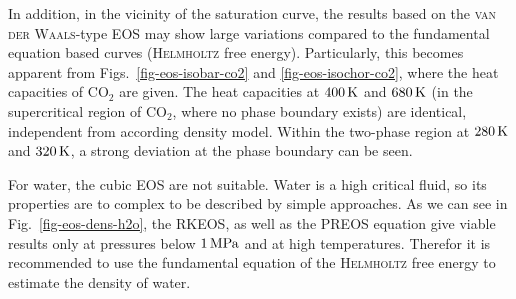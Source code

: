 In addition, in the vicinity of the saturation curve, the results based on the \textsc{van der Waals}-type EOS may show large variations compared to the fundamental equation based curves (\textsc{Helmholtz} free energy). Particularly, this becomes apparent from Figs.~\ref{fig-eos-isobar-co2} and \ref{fig-eos-isochor-co2}, where the heat capacities of $\mathrm{CO_2}$ are given. The heat capacities at $\unit[400]{K}$ and $\unit[680]{K}$ (in the supercritical region of $\mathrm{CO_2}$, where no phase boundary exists) are identical, independent from according density model. Within the two-phase region at $\unit[280]{K}$ and $\unit[320]{K}$, a strong deviation at the phase boundary can be seen.

For water, the cubic EOS are not suitable. Water is a high critical fluid, so its properties are to complex to be described by simple approaches. As we can see in Fig.~\ref{fig-eos-dens-h2o}, the RKEOS, as well as the PREOS equation give viable results only at pressures below $\unit[1]{MPa}$ and at high temperatures. Therefor it is recommended to use the fundamental equation of the \textsc{Helmholtz} free energy to estimate the density of water. 

